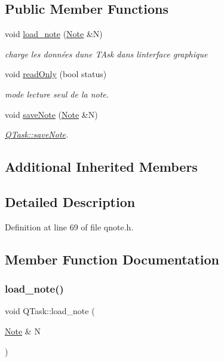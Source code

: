 \subsection*{Public Member Functions}
\begin{DoxyCompactItemize}
\item 
void \hyperlink{class_q_task_a548fc51beaa1dcea345c362782aa11c0}{load\+\_\+note} (\hyperlink{class_note}{Note} \&N)
\begin{DoxyCompactList}\small\item\em charge les données d\textquotesingle{}une T\+Ask dans l\textquotesingle{}interface graphique \end{DoxyCompactList}\item 
void \hyperlink{class_q_task_a1bf9080c14e7a94094bde3fa315d66d9}{read\+Only} (bool status)
\begin{DoxyCompactList}\small\item\em mode lecture seul de la note. \end{DoxyCompactList}\item 
void \hyperlink{class_q_task_ae304b097cdfd1169d2b190bbad3922eb}{save\+Note} (\hyperlink{class_note}{Note} \&N)
\begin{DoxyCompactList}\small\item\em \hyperlink{class_q_task_ae304b097cdfd1169d2b190bbad3922eb}{Q\+Task\+::save\+Note}. \end{DoxyCompactList}\end{DoxyCompactItemize}
\subsection*{Additional Inherited Members}


\subsection{Detailed Description}


Definition at line 69 of file qnote.\+h.



\subsection{Member Function Documentation}
\mbox{\label{class_q_task_a548fc51beaa1dcea345c362782aa11c0}} 
\subsubsection{\texorpdfstring{load\+\_\+note()}{load\_note()}}
{\footnotesize\ttfamily void Q\+Task\+::load\+\_\+note (\begin{DoxyParamCaption}\item[{\hyperlink{class_note}{Note} \&}]{N }\end{DoxyParamCaption})\hspace{0.3cm}{\ttfamily [virtual]}}



